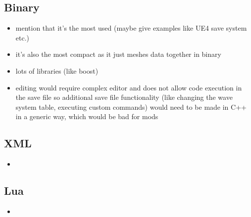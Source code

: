 \subsection{Binary}

\begin{itemize}
    \item mention that it's the most used
	    (maybe give examples like UE4 save system etc.)
    \item it's also the most compact as it just meshes data together in binary
    \item lots of libraries (like boost)
    \item editing would require complex editor and does not allow code execution in the
	    save file so additional save file functionality (like changing the wave
	    system table, executing custom commands) would need to be made in C++
	    in a generic way, which would be bad for mods
\end{itemize}

\subsection{XML}

\begin{itemize}
    \item
\end{itemize}

\subsection{Lua}

\begin{itemize}
    \item
\end{itemize}
